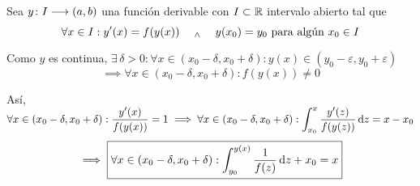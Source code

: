 Sea $y \colon I \longrightarrow (a,b)$ una función derivable con $I\subset \mathbb{R}$ intervalo abierto tal que
\[\forall x \in I : y'(x)=f(y(x)) \quad \; _{\wedge} \; \quad y(x_0)=y_0 \text{ para algún }x_0 \in I\]

Como $y$ es continua, $\exists \, \delta > 0 : \forall x \in (x_0-\delta, x_0+\delta) :y(x)\in(y_0-\varepsilon, y_0+\varepsilon)$
\[\implies \forall x \in (x_0-\delta, x_0+\delta) : f(y(x))\ne 0\]

Así, $\ds \forall x \in (x_0-\delta, x_0+\delta) : \frac{y'(x)}{f(y(x))}=1 \implies \forall x \in (x_0-\delta, x_0+\delta) : \int_{x_0}^{x} \frac{y'(z)}{f(y(z))}\odif{z} = x-x_0$
\[\implies \boxed{\forall x \in (x_0-\delta, x_0+\delta) : \int_{y_0}^{y(x)} \frac{1}{f(z)} \odif{z} + x_0 = x}\]
\pagebreak
{}


